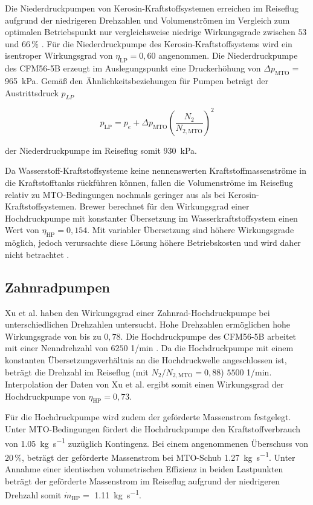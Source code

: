 Die Niederdruckpumpen von Kerosin-Kraftstoffsystemen erreichen im Reiseflug aufgrund der niedrigeren Drehzahlen und Volumenströmen im Vergleich zum optimalen Betriebspunkt nur vergleichsweise niedrige Wirkungsgrade zwischen $53$ und $66\,\%$ \cite{Zhou.2023}. Für die Niederdruckpumpe des Kerosin-Kraftstoffsystems wird ein isentroper Wirkungsgrad von $\eta_{\mathrm{LP}}=0,60$ angenommen. Die Niederdruckpumpe des CFM56-5B erzeugt im Auslegungspunkt eine Druckerhöhung von $\Delta p_{\mathrm{MTO}}=$ \SI{965}{\kilo\Pa}. Gemäß den Ähnlichkeitsbeziehungen für Pumpen \cite{Gulich.2013} beträgt der Austrittsdruck $p_{LP}$ 

\begin{equation}\label{Eq:lpfp}
	p_{\mathrm{LP}}=p_e+\Delta p_{\mathrm{MTO}}\left(\frac{N_2}{N_{2,\mathrm{MTO}}}\right)^2
\end{equation}

der Niederdruckpumpe im Reiseflug somit \SI{930}{\kilo\Pa}.

Da Wasserstoff-Kraftstoffsysteme keine nennenswerten Kraftstoffmassenströme in die Kraftstofftanks rückführen können, fallen die Volumenströme im Reiseflug relativ zu MTO-Bedingungen nochmals geringer aus als bei Kerosin-Kraftstoffsystemen. Brewer \cite{Brewer.1991} berechnet für den Wirkungsgrad einer Hochdruckpumpe mit konstanter Übersetzung im Wasserkraftstoffsystem einen Wert von $\eta_{\mathrm{HP}}=0,154$. Mit variabler Übersetzung sind höhere Wirkungsgrade möglich, jedoch verursachte diese Lösung höhere Betriebskosten und wird daher nicht betrachtet \cite{Brewer.1991}. 

\subsection{Zahnradpumpen}

Xu et al. \cite{Xu.2024} haben den Wirkungsgrad einer Zahnrad-Hochdruckpumpe bei unterschiedlichen Drehzahlen untersucht. Hohe Drehzahlen ermöglichen hohe Wirkungsgrade von bis zu $0,78$. Die Hochdruckpumpe des CFM56-5B arbeitet mit einer Nenndrehzahl von $6250$ 1/min \cite{EatonFuelSystemsDivision.2008}. Da die Hochdruckpumpe mit einem konstanten Übersetzungsverhältnis an die Hochdruckwelle angeschlossen ist, beträgt die Drehzahl im Reiseflug (mit $N_2/N_{2,\mathrm{MTO}}=0,88$) $5500$ 1/min. Interpolation der Daten von Xu et al. \cite{Xu.2024} ergibt somit einen Wirkungsgrad der Hochdruckpumpe von $\eta_{\mathrm{HP}}=0,73$.

Für die Hochdruckpumpe wird zudem der geförderte Massenstrom festgelegt. Unter MTO-Bedingungen fördert die Hochdruckpumpe den Kraftstoffverbrauch von \SI{1.05}{\kg\per\s} zuzüglich Kontingenz. Bei einem angenommenen Überschuss von $20\,\%$, beträgt der geförderte Massenstrom bei MTO-Schub \SI{1.27}{\kg\per\s}. Unter Annahme einer identischen volumetrischen Effizienz in beiden Lastpunkten beträgt der geförderte Massenstrom im Reiseflug aufgrund der niedrigeren Drehzahl somit $\dot{m}_\mathrm{HP}=$ \SI{1.11}{\kg\per\s}.

